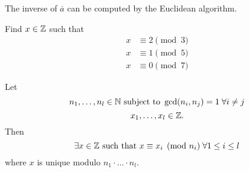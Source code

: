 \documentclass[NumTh.tex]{subfiles}
\begin{document}
\begin{rem}
The inverse of $\overbar{a}$ can be computed by the Euclidean algorithm.
\end{rem}

\begin{ex}
Find $x \in \mathbb{Z}$ such that 
\begin{align}
x &\equiv 2 \pmod{3}\\
x &\equiv 1 \pmod{5}\\
x &\equiv 0 \pmod{7}
\end{align}
\end{ex}

\begin{theorem} Let
\[ n_1,\dots,n_l \in \mathbb{N} \text{ subject to } \gcd (n_i,n_j) = 1 \;\forall i\neq j \]
\[ x_1, \dots, x_l \in \mathbb{Z} \text{.} \]
Then
\[ \exists x \in \mathbb{Z} \text{ such that } x \equiv x_i \pmod{n_i} \; \forall 1\leq i \leq l \]
where $x$ is unique modulo $n_1 \cdot \dots \cdot n_l$.
\end{theorem}
\end{document}
